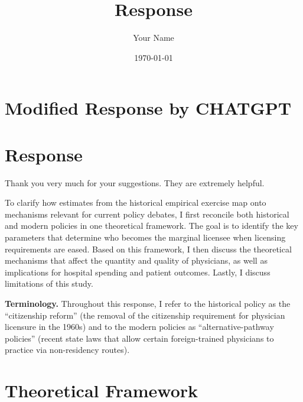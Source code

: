 \documentclass[12pt]{article}
\title{Response}
\author{Your Name}
\date{\today}
\begin{document}
\maketitle


\section{Modified Response by CHATGPT}


\section{Response}

Thank you very much for your suggestions. They are extremely helpful. 

To clarify how estimates from the historical empirical exercise map onto mechanisms relevant for current policy debates, I first reconcile both historical and modern policies in one theoretical framework. The goal is to identify the key parameters that determine who becomes the marginal licensee when licensing requirements are eased. Based on this framework, I then discuss the theoretical mechanisms that affect the quantity and quality of physicians, as well as implications for hospital spending and patient outcomes. Lastly, I discuss limitations of this study.

\textbf{Terminology.} Throughout this response, I refer to the historical policy as the ``citizenship reform'' (the removal of the citizenship requirement for physician licensure in the 1960s) and to the modern policies as ``alternative-pathway policies'' (recent state laws that allow certain foreign-trained physicians to practice via non-residency routes).

\section{Theoretical Framework}
\end{document}
